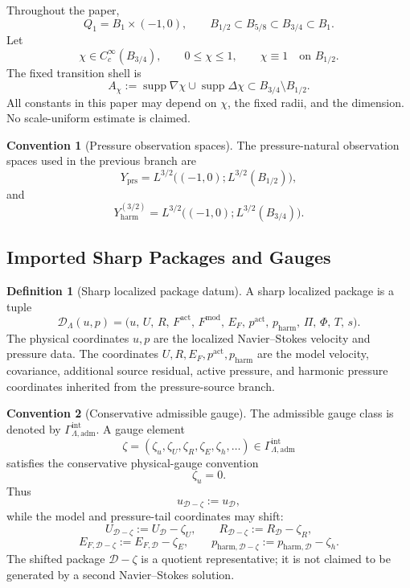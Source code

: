\documentclass[11pt]{article}
\numberwithin{equation}{section}
\theoremstyle{definition}
\newtheorem{definition}[definition]{Definition}
\newtheorem{convention}[convention]{Convention}
\theoremstyle{remark}
\newcommand{\adm}{\mathrm{adm}}
\newcommand{\prs}{\mathrm{prs}}
\newcommand{\harm}{\mathrm{harm}}
\newcommand{\calD}{\mathcal D}
\newcommand{\Yprs}{Y_{\prs}}
\newcommand{\Yharm}{Y_{\harm}^{(3/2)}}
\newcommand{\Qone}{Q_1}
\newcommand{\Gadm}{\Gamma^{\mathrm{int}}_{\Lambda,\adm}}
\begin{document}
Throughout the paper,
\[
    \Qone=B_1\times(-1,0),
    \qquad
    B_{1/2}\subset B_{5/8}\subset B_{3/4}\subset B_1.
\]
Let
\[
    \chi\in C_c^\infty(B_{3/4}),
    \qquad
    0\le \chi\le 1,
    \qquad
    \chi\equiv1\quad\text{on }B_{1/2}.
\]
The fixed transition shell is
\[
    A_\chi
    :=
    \operatorname{supp}\nabla\chi
    \cup
    \operatorname{supp}\Delta\chi
    \subset B_{3/4}\setminus B_{1/2}.
\]
All constants in this paper may depend on \(\chi\), the fixed radii, and
the dimension.  No scale-uniform estimate is claimed.

\begin{convention}[Pressure observation spaces]
\label{loc:conv:pressure-observation-spaces}
The pressure-natural observation spaces used in the previous branch are
\[
    \Yprs
    =
    L^{3/2}\bigl((-1,0);L^{3/2}(B_{1/2})\bigr),
\]
and
\[
    \Yharm
    =
    L^{3/2}\bigl((-1,0);L^{3/2}(B_{3/4})\bigr).
\]
\end{convention}

\subsection{Imported Sharp Packages and Gauges}
\label{loc:sec:packages}

\begin{definition}[Sharp localized package datum]
\label{loc:def:sharp-localized-package}
A sharp localized package is a tuple
\[
    \calD_\Lambda(u,p)
    =
    \bigl(
        u,\,
        U,\,
        R,\,
        F^{\mathrm{act}},\,
        F^{\mathrm{mod}},\,
        E_F,\,
        p^{\mathrm{act}},\,
        p_{\harm},\,
        \Pi,\,
        \Phi,\,
        T,\,
        s
    \bigr).
\]
The physical coordinates \(u,p\) are the localized Navier--Stokes velocity and
pressure data.  The coordinates \(U,R,E_F,p^{\mathrm{act}},p_{\harm}\) are the
model velocity, covariance, additional source residual, active pressure, and
harmonic pressure coordinates inherited from the pressure-source branch.
\end{definition}

\begin{convention}[Conservative admissible gauge]
\label{loc:conv:conservative-gauge}
The admissible gauge class is denoted by \(\Gadm\).  A gauge element
\[
    \zeta=(\zeta_u,\zeta_U,\zeta_R,\zeta_E,\zeta_h,\ldots)\in\Gadm
\]
satisfies the conservative physical-gauge convention
\[
    \zeta_u=0.
\]
Thus
\[
    u_{\calD-\zeta}:=u_{\calD},
\]
while the model and pressure-tail coordinates may shift:
\[
    U_{\calD-\zeta}:=U_{\calD}-\zeta_U,
    \qquad
    R_{\calD-\zeta}:=R_{\calD}-\zeta_R,
\]
\[
    E_{F,\calD-\zeta}:=E_{F,\calD}-\zeta_E,
    \qquad
    p_{\harm,\calD-\zeta}:=p_{\harm,\calD}-\zeta_h.
\]
The shifted package \(\calD-\zeta\) is a quotient representative; it is not
claimed to be generated by a second Navier--Stokes solution.
\end{convention}
\end{document}
